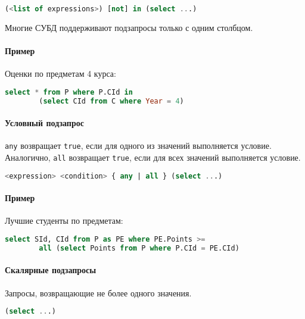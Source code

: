 \begin{lstlisting}[language=SQL]
    (<list of expressions>) [not] in (select ...)
\end{lstlisting}

\begin{remark}
	Многие СУБД поддерживают подзапросы только с одним столбцом.
\end{remark}

\paragraph{Пример}

Оценки по предметам 4 курса:

\begin{lstlisting}[language=SQL]
    select * from P where P.CId in
        (select CId from C where Year = 4)
\end{lstlisting}

\paragraph{Условный подзапрос}

\texttt{any} возвращает \texttt{true}, если для одного из значений выполняется
условие. Аналогично,
\texttt{all} возвращает \texttt{true}, если для всех значений выполняется
условие.

\begin{lstlisting}[language=SQL]
    <expression> <condition> { any | all } (select ...)
\end{lstlisting}

\paragraph{Пример}

Лучшие студенты по предметам:

\begin{lstlisting}[language=SQL]
    select SId, CId from P as PE where PE.Points >=
        all (select Points from P where P.CId = PE.CId)
\end{lstlisting}

\paragraph{Скалярные подзапросы}

Запросы, возвращающие не более одного значения.

\begin{lstlisting}[language=SQL]
    (select ...)
\end{lstlisting}

